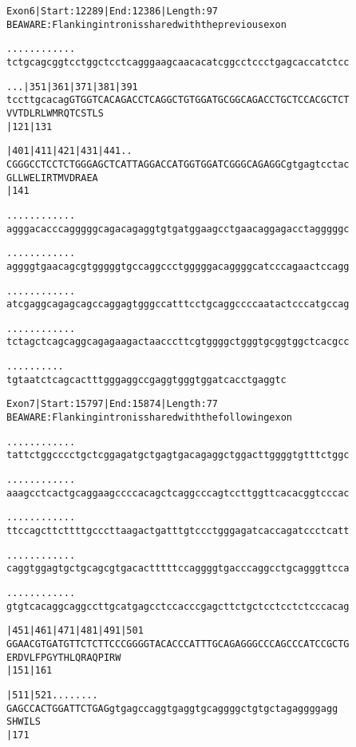 \documentclass{article}
\begin{document}
\newpage
\begin{alltt}
Exon 6 | Start: 12289 | End: 12386 | Length: 97
BE AWARE: Flanking intron is shared with the previous exon

.    .    .    .    .    .    .    .    .    .    .    .    
tctgcagcggtcctggctcctcagggaagcaacacatcggcctccctgagcaccatctcc

.    .    .  |351      |361      |371      |381      |391   
tccttgcacagGTGGTCACAGACCTCAGGCTGTGGATGCGGCAGACCTGCTCCACGCTCT
           V  V  T  D  L  R  L  W  M  R  Q  T  C  S  T  L  S
                       |121                          |131   

   |401      |411      |421      |431      |441      .    . 
CGGGCCTCCTCTGGGAGCTCATTAGGACCATGGTGGATCGGGCAGAGGCgtgagtcctac
  G  L  L  W  E  L  I  R  T  M  V  D  R  A  E  A            
                       |141                                 

   .    .    .    .    .    .    .    .    .    .    .    . 
agggacacccagggggcagacagaggtgtgatggaagcctgaacaggagacctagggggc

   .    .    .    .    .    .    .    .    .    .    .    . 
aggggtgaacagcgtgggggtgccaggccctgggggacaggggcatcccagaactccagg

   .    .    .    .    .    .    .    .    .    .    .    . 
atcgaggcagagcagccaggagtgggccatttcctgcaggccccaatactcccatgccag

   .    .    .    .    .    .    .    .    .    .    .    . 
tctagctcagcaggcagagaagactaacccttcgtggggctgggtgcggtggctcacgcc

   .    .    .    .    .    .    .    .    .    .
tgtaatctcagcactttgggaggccgaggtgggtggatcacctgaggtc
\end{alltt}
\newpage
\begin{alltt}
Exon 7 | Start: 15797 | End: 15874 | Length: 77
BE AWARE: Flanking intron is shared with the following exon

.    .    .    .    .    .    .    .    .    .    .    .    
tattctggcccctgctcggagatgctgagtgacagaggctggacttggggtgtttctggc

.    .    .    .    .    .    .    .    .    .    .    .    
aaagcctcactgcaggaagccccacagctcaggcccagtccttggttcacacggtcccac

.    .    .    .    .    .    .    .    .    .    .    .    
ttccagcttcttttgcccttaagactgatttgtccctgggagatcaccagatccctcatt

.    .    .    .    .    .    .    .    .    .    .    .    
caggtggagtgctgcagcgtgacactttttccaggggtgacccaggcctgcagggttcca

.    .    .    .    .    .    .    .    .    .    .    .    
gtgtcacaggcaggccttgcatgagcctccacccgagcttctgctcctcctctcccacag

    |451      |461      |471      |481      |491      |501  
GGAACGTGATGTTCTCTTCCCGGGGTACACCCATTTGCAGAGGGCCCAGCCCATCCGCTG
 E  R  D  V  L  F  P  G  Y  T  H  L  Q  R  A  Q  P  I  R  W 
    |151                          |161                      

    |511      |521    .    .    .    .    .    .    .    .
GAGCCACTGGATTCTGAGgtgagccaggtgaggtgcaggggctgtgctagaggggagg
 S  H  W  I  L  S                                         
    |171                                                  
\end{alltt}
\end{document}
